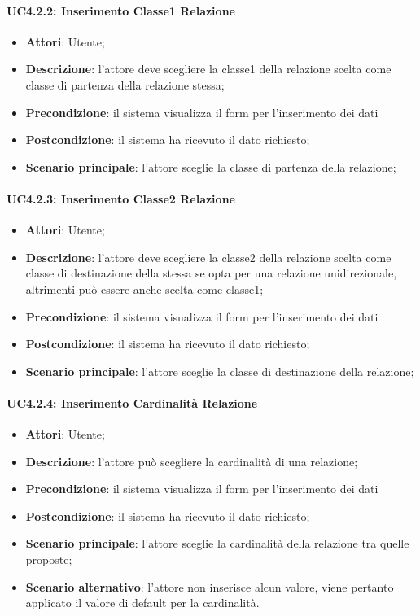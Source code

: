 \paragraph{UC4.2.2: Inserimento Classe1 Relazione}
\label{UC4.2.2}
\begin{itemize}
\item \textbf{Attori}: Utente;
\item \textbf{Descrizione}: l'attore deve scegliere la classe1 della relazione scelta come classe di partenza della relazione stessa;
\item \textbf{Precondizione}: il sistema visualizza il form per l'inserimento dei dati
\item \textbf{Postcondizione}: il sistema ha ricevuto il dato richiesto;
\item \textbf{Scenario principale}:
l'attore sceglie la classe di partenza della relazione;
\end{itemize}

\paragraph{UC4.2.3: Inserimento Classe2 Relazione}
\label{UC4.2.3}
\begin{itemize}
\item \textbf{Attori}: Utente;
\item \textbf{Descrizione}: l'attore deve scegliere la classe2 della relazione scelta come classe di destinazione della stessa se opta per una relazione unidirezionale, altrimenti può essere anche scelta come classe1;
\item \textbf{Precondizione}: il sistema visualizza il form per l'inserimento dei dati	
\item \textbf{Postcondizione}: il sistema ha ricevuto il dato richiesto;	
\item \textbf{Scenario principale}:
l'attore sceglie la classe di destinazione della relazione;	
\end{itemize}

\paragraph{UC4.2.4: Inserimento Cardinalità Relazione}
\label{UC4.2.4}
\begin{itemize}
\item \textbf{Attori}: Utente;
\item \textbf{Descrizione}: l'attore può scegliere la cardinalità di una relazione;
\item \textbf{Precondizione}: il sistema visualizza il form per l'inserimento dei dati	
\item \textbf{Postcondizione}: il sistema ha ricevuto il dato richiesto;	
\item \textbf{Scenario principale}:
l'attore sceglie la cardinalità della relazione tra quelle proposte;
\item \textbf{Scenario alternativo}: l'attore non inserisce alcun valore, viene pertanto applicato il valore di default per la cardinalità.
\end{itemize}

